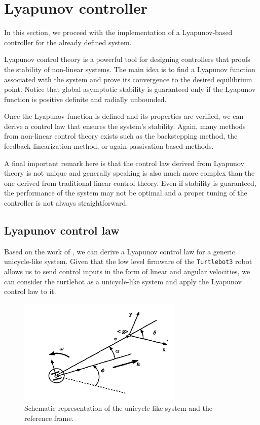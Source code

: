 \section{Lyapunov controller}
\label{sec:lyapunov_controller}

In this section, we proceed with the implementation of a Lyapunov-based controller for the already defined system.

Lyapunov control theory is a powerful tool for designing controllers that proofs the stability of non-linear systems.
The main idea is to find a Lyapunov function associated with the system and prove its convergence to the desired equilibrium point.
Notice that global asymptotic stability is guaranteed only if the Lyapunov function is positive definite and radially unbounded.

Once the Lyapunov function is defined and its properties are verified, we can derive a control law that ensures the system's stability.
Again, many methods from non-linear control theory exists such as the backstepping method, the feedback linearization method, or again passivation-based methods.

A final important remark here is that the control law derived from Lyapunov theory is not unique and generally speaking is also much more complex than the one derived from traditional linear control theory.
Even if stability is guaranteed, the performance of the system may not be optimal and a proper tuning of the controller is not always straightforward.


\subsection{Lyapunov control law}
\label{subsec:lyapunov_control_law}

Based on the work of \cite{lyapunov_techniques}, we can derive a Lyapunov control law for a generic unicycle-like system.
Given that the low level firmware of the \texttt{Turtlebot3} robot allows us to send control inputs in the form of linear and angular velocities, we can consider the turtlebot as a unicycle-like system and apply the Lyapunov control law to it.

\begin{figure}[H]
    \centering
    \includegraphics[width=0.7\textwidth]{./img/lyapunov_scheme.png}
    \caption{Schematic representation of the unicycle-like system and the reference frame.}
    \label{fig:lyapunov_scheme}
\end{figure}


